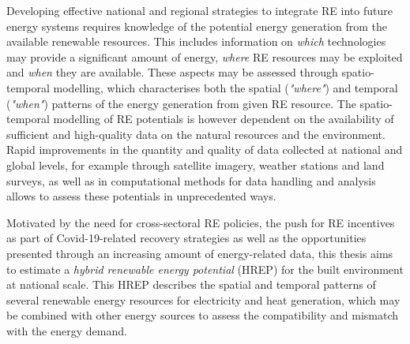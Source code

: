 Developing effective national and regional strategies to integrate RE into future energy systems requires knowledge of the potential energy generation from the available renewable resources. 
This includes information on \textit{which} technologies may provide a significant amount of energy, \textit{where} RE resources may be exploited and \textit{when} they are available. 
These aspects may be assessed through spatio-temporal modelling, which characterises both the spatial (\textit{"where"}) and temporal (\textit{"when"}) patterns of the energy generation from given RE resource.
The spatio-temporal modelling of RE potentials is however dependent on the availability of sufficient and high-quality data on the natural resources and the environment.
Rapid improvements in the quantity and quality of data collected at national and global levels, for example through satellite imagery, weather stations and land surveys, as well as in computational methods for data handling and analysis allows to assess these potentials in unprecedented ways.

Motivated by the need for cross-sectoral RE policies, the push for RE incentives as part of  Covid-19-related recovery strategies as well as the opportunities presented through an increasing amount of energy-related data, this thesis aims to estimate a \textit{hybrid renewable energy potential} (HREP) for the built environment at national scale. 
This HREP describes the spatial and temporal patterns of several renewable energy resources for electricity and heat generation, which may be combined with other energy sources to assess the compatibility and mismatch with the energy demand. 



